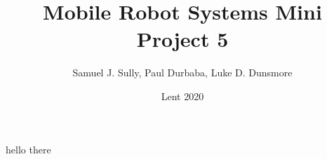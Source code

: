 \documentclass[11pt,a4paper]{article}
\begin{document}
\twocolumn
\title{Mobile Robot Systems Mini Project 5}
\author{Samuel J. Sully, Paul Durbaba, Luke D. Dunsmore}
\date{Lent 2020}
\maketitle
hello there
\end{document}
